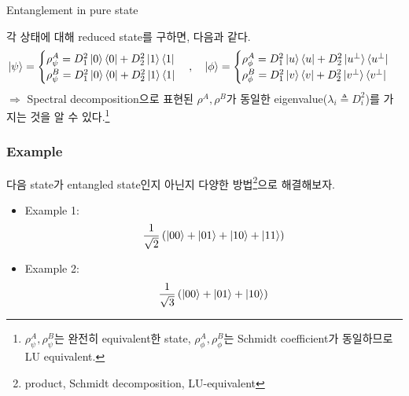 \documentclass[9pt]{beamer}
\begin{document}
\begin{section}{Entanglement in pure state}
\begin{frame}
            \vspace{0.2cm}
            각 상태에 대해 reduced state를 구하면, 다음과 같다.
            \begin{equation*}
                \ket{\psi} = \begin{cases}
                    \rho^A_\psi = D_1^2 \ket 0 \bra 0 + D_2^2 \ket 1 \bra 1\\
                    \rho^B_\psi = D_1^2 \ket 0 \bra 0 + D_2^2 \ket 1 \bra 1
                \end{cases},\quad \ket{\phi} = \begin{cases}
                    \rho^A_\phi = D_1^2 \ket u \bra u + D_2^2 \ket {u^\perp} \bra {u^\perp}\\
                    \rho^B_\phi = D_1^2 \ket v \bra v + D_2^2 \ket {v^\perp} \bra {v^\perp}
                \end{cases}
            \end{equation*}
            $\Rightarrow$ Spectral decomposition으로 표현된 $\rho^A, \rho^B$가 동일한 eigenvalue($\lambda_i \triangleq D_i^2$)를 가지는 것을 알 수 있다.\footnote{$\rho^A_\psi, \rho^B_\psi$는 완전히 equivalent한 state, $\rho^A_\phi, \rho^B_\phi$는 Schmidt coefficient가 동일하므로 LU equivalent.}
        \end{frame}

        \begin{frame}
            \frametitle{Example}
            다음 state가 entangled state인지 아닌지 다양한 방법\footnote{product, Schmidt decomposition, LU-equivalent}으로 해결해보자.
            \begin{itemize}
                \item Example 1:
                \begin{equation*}
                    \frac{1}{\sqrt 2} \left ( \ket{00} + \ket{01} + \ket{10} + \ket{11} \right)
                \end{equation*}
                \item Example 2:
                \begin{equation*}
                    \frac{1}{\sqrt 3} \left ( \ket{00} + \ket{01} + \ket{10} \right)
                \end{equation*}
            \end{itemize}
        \end{frame}


\end{section}
\end{document}
